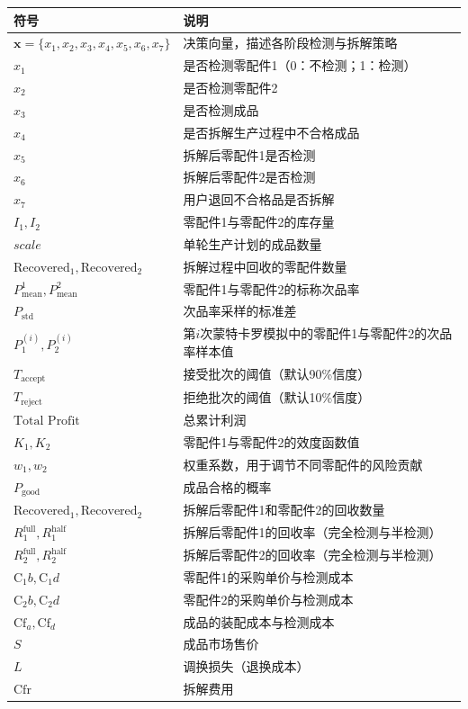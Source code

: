 \documentclass{article}
\begin{document}
	\begin{table}[H]
		\centering
		
		\begin{tabular}{ll}
			\toprule
			符号 & 说明 \\
			\midrule
			\(\mathbf{x} = \{x_1, x_2, x_3, x_4, x_5, x_6, x_7\}\) & 决策向量，描述各阶段检测与拆解策略 \\
			\(x_1\) & 是否检测零配件1（0：不检测；1：检测） \\
			\(x_2\) & 是否检测零配件2 \\
			\(x_3\) & 是否检测成品 \\
			\(x_4\) & 是否拆解生产过程中不合格成品 \\
			\(x_5\) & 拆解后零配件1是否检测 \\
			\(x_6\) & 拆解后零配件2是否检测 \\
			\(x_7\) & 用户退回不合格品是否拆解 \\
			\midrule
			\(I_1, I_2\) & 零配件1与零配件2的库存量 \\
			\(scale\) & 单轮生产计划的成品数量 \\
			\(\text{Recovered}_1, \text{Recovered}_2\) & 拆解过程中回收的零配件数量 \\
			\(P_{\text{mean}}^1, P_{\text{mean}}^2\) & 零配件1与零配件2的标称次品率 \\
			\(P_{\text{std}}\) & 次品率采样的标准差 \\
			\(P_1^{(i)}, P_2^{(i)}\) & 第\(i\)次蒙特卡罗模拟中的零配件1与零配件2的次品率样本值 \\
			\(T_{\text{accept}}\) & 接受批次的阈值（默认90\%信度） \\
			\(T_{\text{reject}}\) & 拒绝批次的阈值（默认10\%信度） \\
			\(\text{Total Profit}\) & 总累计利润 \\
			\(K_1, K_2\) & 零配件1与零配件2的效度函数值 \\
			\(w_1, w_2\) & 权重系数，用于调节不同零配件的风险贡献 \\
			\(P_{\text{good}}\) & 成品合格的概率 \\
			\(\text{Recovered}_1, \text{Recovered}_2\) & 拆解后零配件1和零配件2的回收数量 \\
			\(R_1^{\text{full}}, R_1^{\text{half}}\) & 拆解后零配件1的回收率（完全检测与半检测） \\
			\(R_2^{\text{full}}, R_2^{\text{half}}\) & 拆解后零配件2的回收率（完全检测与半检测） \\
			\(\text{C}_1b, \text{C}_1d\) & 零配件1的采购单价与检测成本 \\
			\(\text{C}_2b, \text{C}_2d\) & 零配件2的采购单价与检测成本 \\
			\(\text{Cf}_a, \text{Cf}_d\) & 成品的装配成本与检测成本 \\
			\(S\) & 成品市场售价 \\
			\(L\) & 调换损失（退换成本） \\
			\(\text{Cfr}\) & 拆解费用 \\
			\bottomrule
		\end{tabular}
	\end{table}
	\newpage
	
\end{document}
